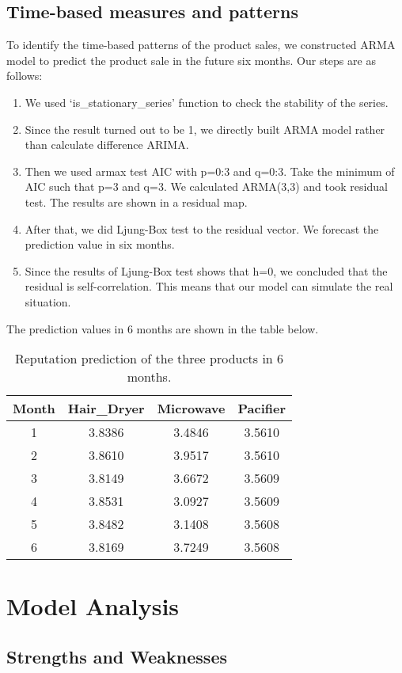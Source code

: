 \documentclass[12pt]{mcmthesis}
\begin{document}
\subsection{Time-based measures and patterns}
To identify the time-based patterns of the product sales, we constructed ARMA model to predict the product sale in the future six months. Our steps are as follows:
\begin{enumerate}
    \item We used `is\_stationary\_series' function to check the stability of the series.
    \item Since the result turned out to be 1, we directly built ARMA model rather than calculate difference ARIMA.
    \item Then we used armax test AIC with p=0:3 and q=0:3. Take the minimum of AIC such that p=3 and q=3. We calculated ARMA(3,3) and took residual test. The results are shown in a residual map.
    \item After that, we did Ljung-Box test to the residual vector. We forecast the prediction value in six months.
    \item Since the results of Ljung-Box test shows that h=0, we concluded that the residual is self-correlation. This means that our model can simulate the real situation.
\end{enumerate}
The prediction values in 6 months are shown in the table below.
\begin{table}[H]
	\centering
	\begin{tabular}{|c|c|c|c|}
		\hline
		Month&Hair\_Dryer&Microwave&Pacifier\\
		\hline
		1&3.8386&3.4846&3.5610\\
		\hline
		2&3.8610&3.9517&3.5610\\
		\hline
		3&3.8149&3.6672&3.5609\\
		\hline
		4&3.8531&3.0927&3.5609\\
		\hline
		5&3.8482&3.1408&3.5608\\
		\hline
		6&3.8169&3.7249&3.5608\\
		\hline
	\end{tabular}
	\caption{Reputation prediction of the three products in 6 months.}
\end{table}
\section{Model Analysis}\label{Sec-Analysis}
\subsection{Strengths and Weaknesses}
\end{document}
